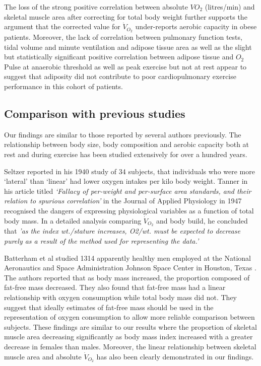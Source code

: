 The loss of the strong positive correlation between absolute $VO_{2}$ (litres/min) and skeletal muscle area after correcting for total body weight further supports the argument that the corrected value for $\dot{V}_{O_2}$ under-reports aerobic capacity in obese patients. Moreover, the lack of correlation between pulmonary function tests, tidal volume and minute ventilation and adipose tissue area as well as the slight but statistically significant positive correlation between adipose tissue and $O_2$Pulse at anaerobic threshold as well as peak exercise but not at rest appear to suggest that adiposity did not contribute to poor cardiopulmonary exercise performance in this cohort of patients.

\subsection{Comparison with previous studies}
Our findings are similar to those reported by several authors previously. The relationship between body size, body composition and aerobic capacity both at rest and during exercise has been studied extensively for over a hundred years.

Seltzer reported in his 1940 study of 34 subjects, that individuals who were more `lateral' than `linear' had lower oxygen intakes per kilo body weight.\parencite{seltzer_body_1940} Tanner in his article titled \textit{`Fallacy of per-weight and per-surface area standards, and their relation to spurious correlation'}\parencite{tanner_fallacy_1949} in the Journal of Applied Physiology in 1947 recognised the dangers of expressing physiological variables as a function of total body mass. In a detailed analysis comparing $\dot{V}_{O_2}$ and body build, he concluded that \textit{'as the index wt./stature increases, O2/wt. must be expected to decrease purely as a result of the method used for representing the data.'}

Batterham et al studied 1314 apparently healthy men employed at the National Aeronautics and Space Administration Johnson Space Center in Houston, Texas \parencite{batterham_modeling_1999}. The authors reported that as body mass increased, the proportion composed of fat-free mass decreased. They also found that fat-free mass had a linear relationship with oxygen consumption while total body mass did not. They suggest that ideally estimates of fat-free mass should be used in the representation of oxygen consumption to allow more reliable comparison between subjects. These findings are similar to our results where the proportion of skeletal muscle area decreasing significantly as body mass index increased with a greater decrease in females than males. Moreover, the linear relationship between skeletal muscle area and absolute $\dot{V}_{O_2}$ has also been clearly demonstrated in our findings. 

